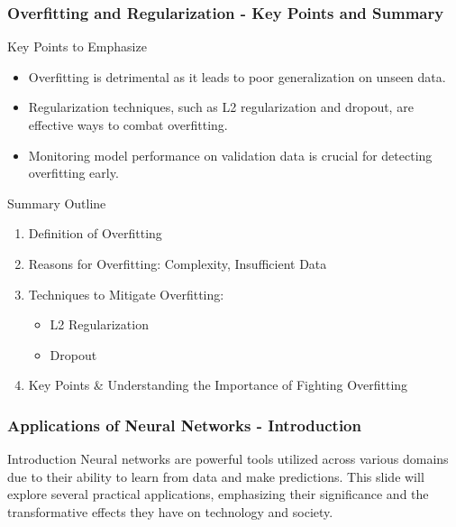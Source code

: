\documentclass[aspectratio=169]{beamer}
\begin{document}
\begin{frame}[fragile]
    \frametitle{Overfitting and Regularization - Key Points and Summary}
    \begin{block}{Key Points to Emphasize}
        \begin{itemize}
            \item Overfitting is detrimental as it leads to poor generalization on unseen data.
            \item Regularization techniques, such as L2 regularization and dropout, are effective ways to combat overfitting.
            \item Monitoring model performance on validation data is crucial for detecting overfitting early.
        \end{itemize}
    \end{block}
    
    \begin{block}{Summary Outline}
        \begin{enumerate}
            \item Definition of Overfitting
            \item Reasons for Overfitting: Complexity, Insufficient Data
            \item Techniques to Mitigate Overfitting:
            \begin{itemize}
                \item L2 Regularization
                \item Dropout
            \end{itemize}
            \item Key Points & Understanding the Importance of Fighting Overfitting
        \end{enumerate}
    \end{block}
\end{frame}

\begin{frame}[fragile]
    \frametitle{Applications of Neural Networks - Introduction}
    \begin{block}{Introduction}
        Neural networks are powerful tools utilized across various domains due to their ability to learn from data and make predictions. This slide will explore several practical applications, emphasizing their significance and the transformative effects they have on technology and society.
    \end{block}
\end{frame}
\end{document}

